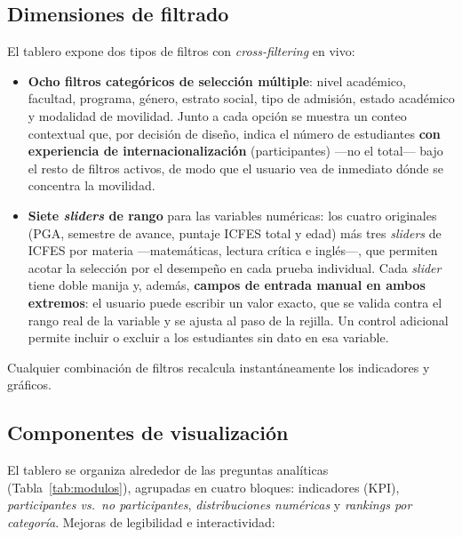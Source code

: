\documentclass[12pt,a4paper]{article}
\begin{document}
\subsection{Dimensiones de filtrado}
El tablero expone dos tipos de filtros con \emph{cross-filtering} en vivo:

\begin{itemize}[leftmargin=*]
    \item \textbf{Ocho filtros categóricos de selección múltiple}: nivel académico,
    facultad, programa, género, estrato social, tipo de admisión, estado académico
    y modalidad de movilidad. Junto a cada opción se muestra un conteo contextual
    que, por decisión de diseño, indica el número de estudiantes \textbf{con
    experiencia de internacionalización} (participantes) ---no el total--- bajo el
    resto de filtros activos, de modo que el usuario vea de inmediato dónde se
    concentra la movilidad.
    \item \textbf{Siete \emph{sliders} de rango} para las variables numéricas: los
    cuatro originales (PGA, semestre de avance, puntaje ICFES total y edad) más tres
    \emph{sliders} de ICFES por materia ---matemáticas, lectura crítica e inglés---,
    que permiten acotar la selección por el desempeño en cada prueba individual.
    Cada \emph{slider} tiene doble
    manija y, además, \textbf{campos de entrada manual en ambos extremos}: el
    usuario puede escribir un valor exacto, que se valida contra el rango real de la
    variable y se ajusta al paso de la rejilla. Un control adicional permite incluir
    o excluir a los estudiantes sin dato en esa variable.
\end{itemize}

Cualquier combinación de filtros recalcula instantáneamente los indicadores y
gráficos.

\subsection{Componentes de visualización}
El tablero se organiza alrededor de las preguntas analíticas
(Tabla~\ref{tab:modulos}), agrupadas en cuatro bloques: indicadores (KPI),
\emph{participantes vs.\ no participantes}, \emph{distribuciones numéricas} y
\emph{rankings por categoría}. Mejoras de legibilidad e interactividad:
\end{document}
